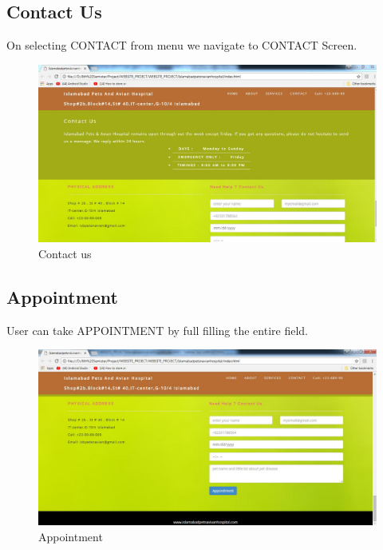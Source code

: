 \subsection{Contact Us}
On selecting CONTACT from menu we navigate to CONTACT Screen.
\begin{figure}[H]
  \centering
    \includegraphics[scale=0.4]{contact}
     \caption{Contact us}
\end{figure}

\newpage
\subsection{Appointment}
User can take APPOINTMENT by full filling the entire field.
\begin{figure}[H]
  \centering
    \includegraphics[scale=0.4]{appint}
     \caption{Appointment}
\end{figure}
















